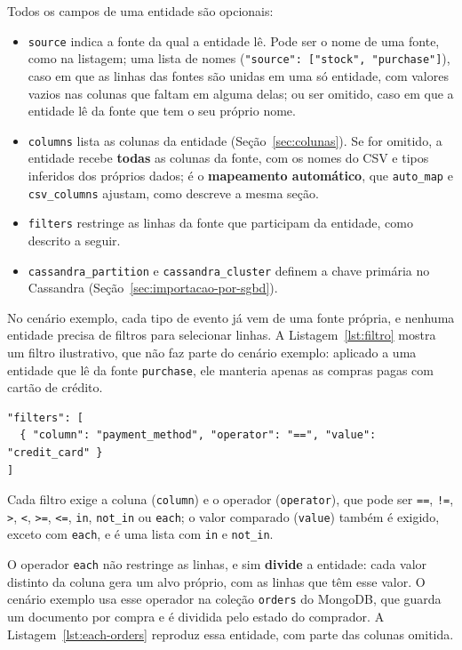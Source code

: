 Todos os campos de uma entidade são opcionais:

\begin{itemize}
  \item \texttt{source} indica a fonte da qual a entidade lê. Pode ser o nome de uma fonte,
  como na listagem; uma lista de nomes (\texttt{"source": ["stock", "purchase"]}), caso em
  que as linhas das fontes são unidas em uma só entidade, com valores vazios nas colunas
  que faltam em alguma delas; ou ser omitido, caso em que a entidade lê da fonte que tem o
  seu próprio nome.
  \item \texttt{columns} lista as colunas da entidade (Seção~\ref{sec:colunas}). Se for
  omitido, a entidade recebe \textbf{todas} as colunas da fonte, com os nomes do CSV e
  tipos inferidos dos próprios dados; é o \textbf{mapeamento automático}, que
  \texttt{auto\_map} e \texttt{csv\_columns} ajustam, como descreve a mesma seção.
  \item \texttt{filters} restringe as linhas da fonte que participam da entidade, como
  descrito a seguir.
  \item \texttt{cassandra\_partition} e \texttt{cassandra\_cluster} definem a chave
  primária no Cassandra (Seção~\ref{sec:importacao-por-sgbd}).
\end{itemize}

No cenário exemplo, cada tipo de evento já vem de uma fonte própria, e nenhuma entidade
precisa de filtros para selecionar linhas. A Listagem~\ref{lst:filtro} mostra um filtro
ilustrativo, que não faz parte do cenário exemplo: aplicado a uma entidade que lê da fonte
\texttt{purchase}, ele manteria apenas as compras pagas com cartão de crédito.

\begin{lstlisting}[style=jsonstyle,caption={Filtro ilustrativo sobre a coluna \texttt{payment\_method}.},label={lst:filtro}]
"filters": [
  { "column": "payment_method", "operator": "==", "value": "credit_card" }
]
\end{lstlisting}

Cada filtro exige a coluna (\texttt{column}) e o operador (\texttt{operator}), que pode ser
\texttt{==}, \texttt{!=}, \texttt{>}, \texttt{<}, \texttt{>=}, \texttt{<=}, \texttt{in},
\texttt{not\_in} ou \texttt{each}; o valor comparado (\texttt{value}) também é exigido,
exceto com \texttt{each}, e é uma lista com \texttt{in} e \texttt{not\_in}.

O operador \texttt{each} não restringe as linhas, e sim \textbf{divide} a entidade: cada
valor distinto da coluna gera um alvo próprio, com as linhas que têm esse valor. O
cenário exemplo usa esse operador na coleção \texttt{orders} do MongoDB, que guarda um
documento por compra e é dividida pelo estado do comprador. A
Listagem~\ref{lst:each-orders} reproduz essa entidade, com parte das colunas omitida.

